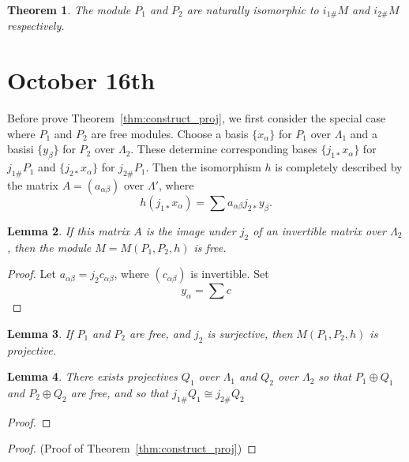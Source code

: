 \documentclass[11pt]{article}
\newtheorem{thm}{Theorem}[section]
\newtheorem{lemma}[thm]{Lemma}
\begin{document}
\begin{thm}\label{thm:construct_iso2}
The module $P_1$ and $P_2$ are naturally isomorphic to $i_{1\#} M$ and $i_{2\#} M$ respectively.
\end{thm}

\section{October 16th}
Before prove Theorem~\ref{thm:construct_proj}, we first consider the special case where $P_1$ and $P_2$ are free modules.
Choose a basis $\{x_\alpha\}$ for $P_1$ over $\Lambda_1$ and a basisi $\{y_\beta\}$ for $P_2$ over $\Lambda_2$. These determine corresponding bases $\{j_{1*}x_\alpha\}$ for $j_{1\#}P_1$ and $\{j_{2*}x_\alpha\}$ for $j_{2\#}P_1$. Then the isomorphism $h$ is completely described by the matrix $A=(a_{\alpha\beta})$ over $\Lambda'$, where 
$$
h(j_{1*}x_\alpha)=\sum a_{\alpha\beta}j_{2*}y_\beta
.
$$

\begin{lemma}
If this matrix $A$ is the image under $j_2$ of an invertible matrix over $\Lambda_2$, then the module $M=M(P_1,P_2,h)$ is free.
\end{lemma}
\begin{proof}
Let $a_{\alpha\beta}=j_2c_{\alpha\beta}$, where $(c_{\alpha\beta})$ is invertible. Set 
$$
y_\alpha=\sum c
$$
\end{proof}

\begin{lemma}
If $P_1$ and $P_2$ are free, and $j_2$ is surjective, then $M(P_1,P_2, h)$ is projective.
\end{lemma}

\begin{lemma}
There exists projectives $Q_1$ over $\Lambda_1$ and $Q_2$ over $\Lambda_2$ so that $P_1\oplus Q_1$ and $P_2\oplus Q_2$ are free, and so that $j_{1\#}Q_1\cong j_{2\#}Q_2$
\end{lemma}
\begin{proof}
\end{proof}

\begin{proof}(Proof of Theorem~\ref{thm:construct_proj})
\end{proof}
\end{document}
